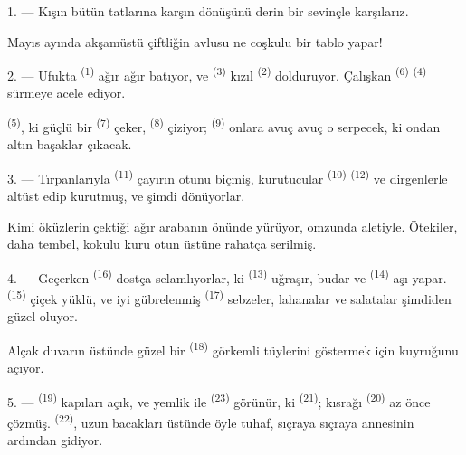 1. --- Kışın bütün tatlarına karşın  dönüşünü derin bir
sevinçle karşılarız.

Mayıs ayında akşamüstü çiftliğin avlusu ne coşkulu bir tablo yapar!

2. --- Ufukta  \textsuperscript{(1)} ağır ağır batıyor, ve
 \textsuperscript{(3)} kızıl 
\textsuperscript{(2)} dolduruyor. Çalışkan 
\textsuperscript{(6)}  \textsuperscript{(4)} sürmeye
acele ediyor.

 \textsuperscript{(5)}, ki güçlü bir 
\textsuperscript{(7)} çeker,  \textsuperscript{(8)}
çiziyor;
 \textsuperscript{(9)} onlara avuç avuç o 
serpecek, ki ondan altın başaklar çıkacak.

3. --- Tırpanlarıyla  \textsuperscript{(11)} çayırın
otunu biçmiş, kurutucular  \textsuperscript{(10)}
 \textsuperscript{(12)} ve dirgenlerle altüst edip
kurutmuş, ve şimdi dönüyorlar.

Kimi öküzlerin çektiği ağır arabanın önünde yürüyor, omzunda aletiyle.
Ötekiler, daha tembel, kokulu kuru otun üstüne rahatça serilmiş.

4. --- Geçerken  \textsuperscript{(16)} dostça selamlıyorlar,
ki  \textsuperscript{(13)} uğraşır, 
budar ve  \textsuperscript{(14)} aşı yapar.
 \textsuperscript{(15)} çiçek yüklü, ve iyi gübrelenmiş
 \textsuperscript{(17)} sebzeler, lahanalar ve
salatalar şimdiden güzel oluyor.

Alçak duvarın üstünde güzel bir  \textsuperscript{(18)}
görkemli tüylerini göstermek için kuyruğunu açıyor.

\VUsaut{3.0mm}

5. ---  \textsuperscript{(19)} kapıları açık, ve yemlik
ile  \textsuperscript{(23)} görünür, ki
 \textsuperscript{(21)}; kısrağı 
\textsuperscript{(20)} az önce çözmüş.  \textsuperscript{(22)}, uzun bacakları
üstünde öyle tuhaf, sıçraya sıçraya annesinin ardından gidiyor.

